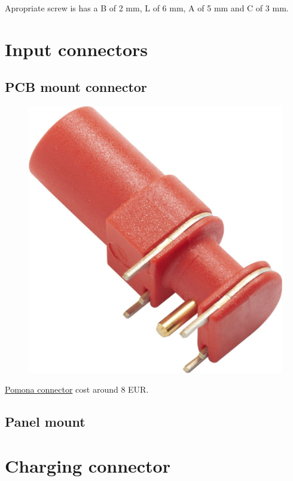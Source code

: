 \documentclass[11pt]{article}
\begin{document}
Apropriate screw is has a B of 2 mm, L of 6 mm, A of 5 mm and C of 3 mm. 

\section{Input connectors}

\subsection{PCB mount connector}

\begin{figure}[H]
  \centering 
  \includegraphics[scale=0.1]{"./figs/pomona.jpg"}
\end{figure}



\href{https://www.mouser.co.uk/ProductDetail/Pomona-Electronics/73099-2?qs=B6kkDfuK7%2FA6DpEPKtHqWw%3D%3D}{Pomona connector} 
  cost around 8 EUR.


\subsection{Panel mount}

\section{Charging connector}
\end{document}
